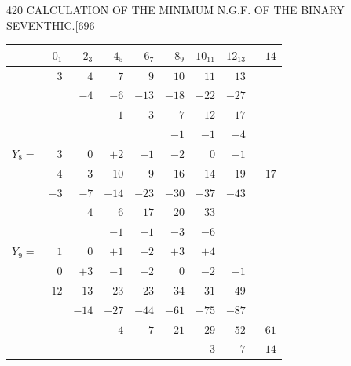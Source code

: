 \documentclass[11pt]{article}
\begin{document}
\clearpage
\begin{center}\small 420 \hfill CALCULATION OF THE MINIMUM N.G.F. OF THE BINARY SEVENTHIC.\hfill [696\end{center}

\begin{center}\small
\begin{tabular}{l|rrrrrrrr}
          & $0_{1}$ & $2_{3}$ & $4_{5}$ & $6_{7}$ & $8_{9}$ & $10_{11}$ & $12_{13}$ & $14$ \\\hline
          & $3$     & $4$     & $7$     & $9$     & $10$    & $11$      & $13$      &      \\
          &         & $-4$    & $-6$    & $-13$   & $-18$   & $-22$     & $-27$     &      \\
          &         &         & $1$     & $3$     & $7$     & $12$      & $17$      &      \\
          &         &         &         &         & $-1$    & $-1$      & $-4$      &      \\
$Y_{8}=$  & $3$     & $0$     & $+2$    & $-1$    & $-2$    & $0$       & $-1$      &      \\\hline
          & $4$     & $3$     & $10$    & $9$     & $16$    & $14$      & $19$      & $17$ \\
          & $-3$    & $-7$    & $-14$   & $-23$   & $-30$   & $-37$     & $-43$     &      \\
          &         & $4$     & $6$     & $17$    & $20$    & $33$      &           &      \\
          &         &         & $-1$    & $-1$    & $-3$    & $-6$      &           &      \\
$Y_{9}=$  & $1$     & $0$     & $+1$    & $+2$    & $+3$    & $+4$      &           &      \\\hline
          & $0$     & $+3$    & $-1$    & $-2$    & $0$     & $-2$      & $+1$      &      \\
          & $12$    & $13$    & $23$    & $23$    & $34$    & $31$      & $49$      &      \\
          &         & $-14$   & $-27$   & $-44$   & $-61$   & $-75$     & $-87$     &      \\
          &         &         & $4$     & $7$     & $21$    & $29$      & $52$      & $61$ \\
          &         &         &         &         &         & $-3$      & $-7$      & $-14$\\

\end{tabular}
\end{center}
\end{document}
